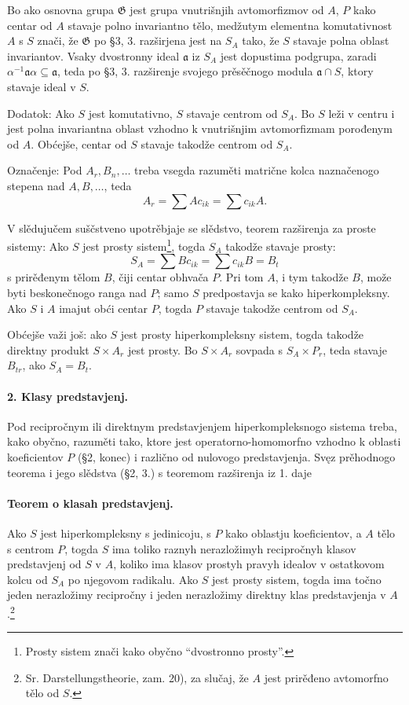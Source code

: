 \documentclass[11pt]{article}
\newcommand{\foreign}[1]{#1}
\providecommand{\frG}{\mathfrak G}
\providecommand{\glqq}{``}
\providecommand{\grqq}{''}
\begin{document}
Bo ako osnovna grupa \(\frG\) jest grupa vnutrišnjih avtomorfizmov od \(A\), \(P\) kako centar od \(A\) stavaje polno invariantno tělo, medžutym elementna komutativnost \(A\) s \(S\) znači, že \(\frG\) po §3, 3. razširjena jest na \(S_A\) tako, že \(S\) stavaje polna oblast invariantov. Vsaky dvostronny ideal \(\mathfrak a\) iz \(S_A\) jest dopustima podgrupa, zaradi \(\alpha^{-1}\mathfrak a\alpha\subseteq\mathfrak a\), teda po §3, 3. razširenje svojego prěsěčnogo modula \(\mathfrak a\cap S\), ktory stavaje ideal v \(S\).

Dodatok: Ako \(S\) jest komutativno, \(S\) stavaje centrom od \(S_A\). Bo \(S\) leži v centru i jest polna invariantna oblast vzhodno k vnutrišnjim avtomorfizmam porođenym od \(A\). Obćejše, centar od \(S\) stavaje takodže centrom od \(S_A\).

Označenje: Pod \(A_r,B_n,\ldots\) treba vsegda razuměti matrične kolca naznačenogo stepena nad \(A,B,\ldots\), teda
\[
        A_r=\sum A c_{ik}=\sum c_{ik}A.
\]

V slědujučem suščstveno upotrěbjaje se slědstvo, teorem razširenja za proste sistemy: Ako \(S\) jest prosty sistem\footnote{Prosty sistem znači kako obyčno \glqq{}dvostronno prosty\grqq{}.}, togda \(S_A\) takodže stavaje prosty:
\[
        S_A=\sum B c_{ik}=\sum c_{ik}B=B_t
\]
s prirěđenym tělom \(B\), čiji centar obhvača \(P\). Pri tom \(A\), i tym takodže \(B\), može byti beskonečnogo ranga nad \(P\); samo \(S\) predpostavja se kako hiperkompleksny. Ako \(S\) i \(A\) imajut obći centar \(P\), togda \(P\) stavaje takodže centrom od \(S_A\).

Obćejše važi još: ako \(S\) jest prosty hiperkompleksny sistem, togda takodže direktny produkt \(S\times A_r\) jest prosty. Bo \(S\times A_r\) sovpada s \(S_A\times P_r\), teda stavaje \(B_{tr}\), ako \(S_A=B_t\).

\paragraph{2. Klasy predstavjenj.}
Pod recipročnym ili direktnym predstavjenjem hiperkompleksnogo sistema treba, kako obyčno, razuměti tako, ktore jest operatorno-homomorfno vzhodno k oblasti koeficientov \(P\) (§2, konec) i različno od nulovogo predstavjenja. Svęz prěhodnogo teorema i jego slědstva (§2, 3.) s teoremom razširenja iz 1. daje

\paragraph{Teorem o klasah predstavjenj.}
Ako \(S\) jest hiperkompleksny s jedinicoju, s \(P\) kako oblastju koeficientov, a \(A\) tělo s centrom \(P\), togda \(S\) ima toliko raznyh nerazložimyh recipročnyh klasov predstavjenj od \(S\) v \(A\), koliko ima klasov prostyh pravyh idealov v ostatkovom kolcu od \(S_A\) po njegovom radikalu. Ako \(S\) jest prosty sistem, togda ima točno jeden nerazložimy recipročny i jeden nerazložimy direktny klas predstavjenja v \(A\).\footnote{Sr. \foreign{Darstellungstheorie}, zam. 20), za slučaj, že \(A\) jest prirěđeno avtomorfno tělo od \(S\).}
\end{document}
